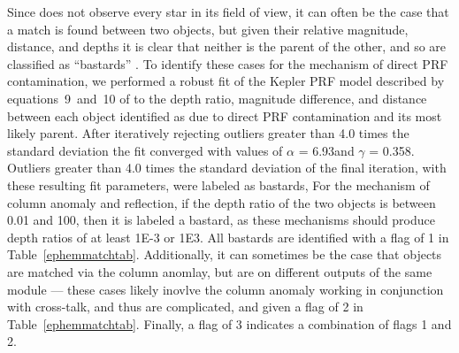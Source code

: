 Since \kepler{} does not observe every star in its field of view, it can often be the case that a match is found between two objects, but given their relative magnitude, distance, and depths it is clear that neither is the parent of the other, and so are classified as ``bastards'' \citep{Coughlin2014a}. To identify these cases for the mechanism of direct PRF contamination, we performed a robust fit of the Kepler PRF model described by equations~9~and~10 of \citet{Coughlin2014a} to the depth ratio, magnitude difference, and distance between each object identified as due to direct PRF contamination and its most likely parent. After iteratively rejecting outliers greater than 4.0 times the standard deviation the fit converged with values of $\alpha$ = 6.93\arcsec and $\gamma$ = 0.358\arcsec. Outliers greater than 4.0 times the standard deviation of the final iteration, with these resulting fit parameters, were labeled as bastards, For the mechanism of column anomaly and reflection, if the depth ratio of the two objects is between 0.01 and 100, then it is labeled a bastard, as these mechanisms should produce depth ratios of at least 1E-3 or 1E3. All bastards are identified with a flag of 1 in Table~\ref{ephemmatchtab}. Additionally, it can sometimes be the case that objects are matched via the column anomlay, but are on different outputs of the same module --- these cases likely inovlve the column anomaly working in conjunction with cross-talk, and thus are complicated, and given a flag of 2 in Table~\ref{ephemmatchtab}. Finally, a flag of 3 indicates a combination of flags 1 and 2. 
